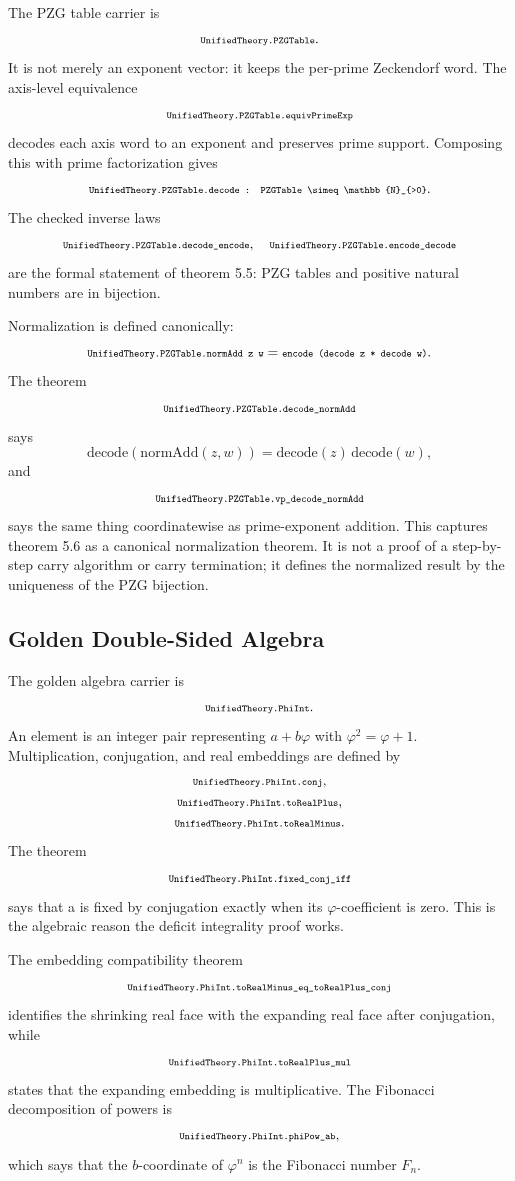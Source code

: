\documentclass[11pt]{article}
\newcommand{\lean}[1]{\relax\ifmmode\hbox{\scriptsize\ttfamily\detokenize{#1}}\else{\small\texttt{\detokenize{#1}}}\fi}
\newcommand{\Npos}{\mathbb{N}_{>0}}
\newcommand{\phiG}{\varphi}
\begin{document}
The PZG table carrier is
$$
  \lean{UnifiedTheory.PZGTable}.
$$
It is not merely an exponent vector: it keeps the per-prime Zeckendorf word.  The axis-level equivalence
$$
  \lean{UnifiedTheory.PZGTable.equivPrimeExp}
$$
decodes each axis word to an exponent and preserves prime support.  Composing this with prime factorization gives
$$
  \lean{UnifiedTheory.PZGTable.decode : PZGTable \simeq \Npos}.
$$
The checked inverse laws
$$
  \lean{UnifiedTheory.PZGTable.decode_encode},\quad
  \lean{UnifiedTheory.PZGTable.encode_decode}
$$
are the formal statement of theorem 5.5: PZG tables and positive natural numbers are in bijection.

Normalization is defined canonically:
$$
  \lean{UnifiedTheory.PZGTable.normAdd z w}
  =
  \lean{encode (decode z * decode w)}.
$$
The theorem
$$
  \lean{UnifiedTheory.PZGTable.decode_normAdd}
$$
says
$$
  \mathrm{decode}(\mathrm{normAdd}(z,w))
  =
  \mathrm{decode}(z)\,\mathrm{decode}(w),
$$
and
$$
  \lean{UnifiedTheory.PZGTable.vp_decode_normAdd}
$$
says the same thing coordinatewise as prime-exponent addition.  This captures theorem 5.6 as a canonical normalization theorem.  It is not a proof of a step-by-step carry algorithm or carry termination; it defines the normalized result by the uniqueness of the PZG bijection.

\subsection{Golden Double-Sided Algebra}

The golden algebra carrier is
$$
  \lean{UnifiedTheory.PhiInt}.
$$
An element is an integer pair representing $a+b\phiG$ with $\phiG^2=\phiG+1$.  Multiplication, conjugation, and real embeddings are defined by
$$
  \begin{gathered}
  \lean{UnifiedTheory.PhiInt.conj},\\
  \lean{UnifiedTheory.PhiInt.toRealPlus},\\
  \lean{UnifiedTheory.PhiInt.toRealMinus}.
  \end{gathered}
$$
The theorem
$$
  \lean{UnifiedTheory.PhiInt.fixed_conj_iff}
$$
says that a \lean{PhiInt} is fixed by conjugation exactly when its $\phiG$-coefficient is zero.  This is the algebraic reason the deficit integrality proof works.

The embedding compatibility theorem
$$
  \lean{UnifiedTheory.PhiInt.toRealMinus_eq_toRealPlus_conj}
$$
identifies the shrinking real face with the expanding real face after conjugation, while
$$
  \lean{UnifiedTheory.PhiInt.toRealPlus_mul}
$$
states that the expanding embedding is multiplicative.  The Fibonacci decomposition of powers is
$$
  \lean{UnifiedTheory.PhiInt.phiPow_ab},
$$
which says that the $b$-coordinate of $\phiG^n$ is the Fibonacci number $F_n$.
\end{document}
